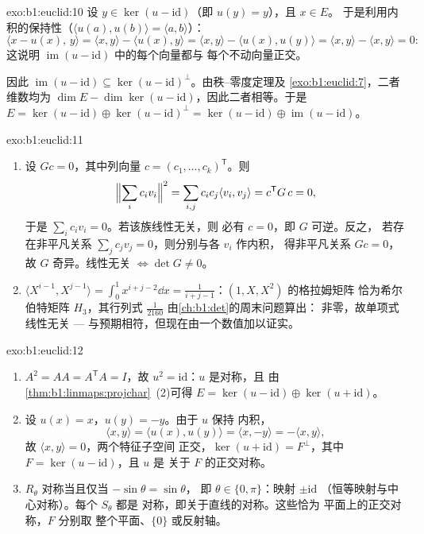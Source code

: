 \begin{solution}{exo:b1:euclid:10}
设 $y \in \ker(u - \mathrm{id})$（即 $u(y) = y$），且 $x \in E$。
于是利用内积的保持性（$\langle u(a),
u(b)\rangle = \langle a, b\rangle$）：
\[
\langle x - u(x),\, y\rangle
= \langle x, y\rangle - \langle u(x), y\rangle
= \langle x, y\rangle - \langle u(x), u(y)\rangle
= \langle x, y\rangle - \langle x, y\rangle = 0 :
\]
这说明 $\operatorname{im}(u - \mathrm{id})$ 中的每个向量都与
每个不动向量正交。

因此 $\operatorname{im}(u - \mathrm{id}) \subseteq \ker(u -
\mathrm{id})^{\perp}$。由秩--零度定理及
\cref{exo:b1:euclid:7}，二者维数均为 $\dim E - \dim\ker(u -
\mathrm{id})$，因此二者相等。于是 $E = \ker(u - \mathrm{id})
\oplus \ker(u - \mathrm{id})^\perp = \ker(u - \mathrm{id}) \oplus
\operatorname{im}(u - \mathrm{id})$。
\end{solution}

\begin{solution}{exo:b1:euclid:11}
\begin{enumerate}
  \item 设 $Gc = 0$，其中列向量 $c = (c_1, \dots,
        c_k)^{\mathsf T}$。则
        \[
        \Bigl\lVert\sum_i c_i v_i\Bigr\rVert^2
        = \sum_{i,j} c_i c_j \langle v_i, v_j\rangle
        = c^{\mathsf T} G\, c = 0,
        \]
        于是 $\sum_i c_i v_i = 0$。若该族线性无关，则
        必有 $c = 0$，即 $G$ 可逆。反之，
        若存在非平凡关系 $\sum_j c_j v_j = 0$，则分别与各 $v_i$ 作内积，
        得非平凡关系
        $Gc = 0$，故 $G$ 奇异。线性无关 $\iff \det G \neq 0$。
  \item $\langle X^{i-1}, X^{j-1}\rangle = \int_0^1 x^{i+j-2}\dd
        x = \frac{1}{i+j-1}$：$(1, X, X^2)$ 的格拉姆矩阵
        恰为希尔伯特矩阵 $H_3$，其行列式
        $\frac1{2160}$ 由\cref{ch:b1:det}的周末问题算出：
        非零，故单项式线性无关 ---
        与预期相符，但现在由一个数值加以证实。
\end{enumerate}
\end{solution}

\begin{solution}{exo:b1:euclid:12}
\begin{enumerate}
  \item $A^2 = A A = A^{\mathsf T} A = I$，故 $u^2 =
        \mathrm{id}$：$u$ 是对称，且
        由\cref{thm:b1:linmaps:projchar}~(2)可得 $E = \ker(u -
        \mathrm{id}) \oplus \ker(u + \mathrm{id})$。
  \item 设 $u(x) = x$，$u(y) = -y$。由于 $u$ 保持
        内积，
        \[
        \langle x, y\rangle = \langle u(x), u(y)\rangle
        = \langle x, -y\rangle = -\langle x, y\rangle ,
        \]
        故 $\langle x, y\rangle = 0$，两个特征子空间
        正交，$\ker(u + \mathrm{id}) = F^\perp$，其中 $F =
        \ker(u - \mathrm{id})$，且 $u$ 是
        关于 $F$ 的正交对称。
  \item $R_\theta$ 对称当且仅当 $-\sin\theta = \sin\theta$，
        即 $\theta \in \{0, \pi\}$：映射 $\pm\mathrm{id}$
        （恒等映射与中心对称）。每个 $S_\theta$ 都是
        对称，即关于直线的对称。这些恰为
        平面上的正交对称，$F$ 分别取
        整个平面、$\{0\}$ 或反射轴。
\end{enumerate}
\end{solution}

